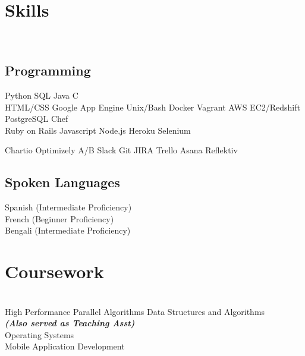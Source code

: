 \documentclass[]{deedy-resume-openfont}
\begin{document}
\begin{minipage}[t]{0.33\textwidth}

\section{Skills}
\\[1\baselineskip]
\subsection{Programming}

Python \textbullet{}  SQL  \textbullet{} Java \textbullet{} C \textbullet{}
\\[1\baselineskip]

HTML/CSS \textbullet{}
Google App Engine \textbullet{} 
Unix/Bash \textbullet{}
Docker \textbullet{} 
Vagrant \textbullet{} 
AWS EC2/Redshift \textbullet{}
PostgreSQL \textbullet{} 
Chef \textbullet{} 
\\[1\baselineskip]

Ruby on Rails \textbullet{}
Javascript \textbullet{} 
Node.js \textbullet{} 
Heroku \textbullet{} 
Selenium
\sectionsep

Chartio \textbullet{} 
Optimizely A/B \textbullet{} 
Slack \textbullet{} 
Git \textbullet{} 
JIRA \textbullet{} 
Trello \textbullet{} 
Asana \textbullet{} 
Reflektiv
\sectionsep

\subsection{Spoken Languages}
Spanish (Intermediate Proficiency) \\
French (Beginner Proficiency)\\
Bengali (Intermediate Proficiency)\\
[1\baselineskip]


\section{Coursework}
\\[1\baselineskip]
High Performance Parallel Algorithms
Data Structures and Algorithms\\
{\footnotesize \textit{\textbf{(Also served as Teaching Asst) }}} \\
Operating Systems\\
Mobile Application Development\\
\sectionsep
%
%

\end{minipage} 
\end{document}
